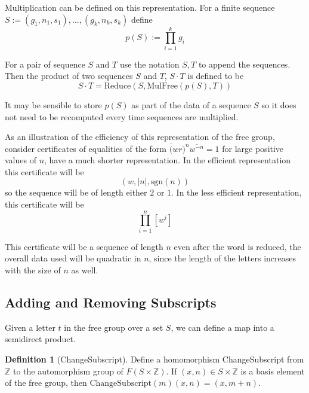 \documentclass[11pt]{article} %
\theoremstyle{definition}
\theoremstyle{definition}
\theoremstyle{definition}
\theoremstyle{definition}
\theoremstyle{definition}
\newtheorem{defn}[theorem]{Definition}
\theoremstyle{definition}
\begin{document}

Multiplication can be defined on this representation.
For a finite sequence $S := (g_1, n_1, s_1), \dots, (g_k, n_k, s_k)$
define
\begin{equation}
  p(S) := \prod_{i=1}^k g_i
\end{equation}

For a pair of sequence $S$ and $T$ use the notation $S,T$ to append the sequences.
Then the product of two sequences $S$ and $T$, $S\cdot T$ is defined to be
\begin{equation}
  S \cdot T = \text{Reduce}(S, \text{MulFree}(p(S), T))
\end{equation}

It may be sensible to store $p(S)$ as part of the data of a sequence $S$ so it does not
need to be recomputed every time sequences are multiplied.

As an illustration of the efficiency of this
representation of the free group, consider certificates of equalities
of the form $\overline(wr)^n \overline{w^{-n}} = 1$ for
large positive values of $n$,
have a much shorter representation.
In the efficient representation this certificate will
be
\begin{equation}
  (w, |n|, \text{sgn}(n))
\end{equation}
so the sequence
will be of length either $2$ or $1$. In the less efficient representation,
this certificate will be
\begin{equation}
  \prod_{i=1}^n [w^i]
\end{equation}

This certificate will be a sequence of length $n$ even after the word is reduced,
the overall data used will be quadratic in $n$, since the length of the letters
increases with the size of $n$ as well.

\subsection{Adding and Removing Subscripts}

Given a letter $t$ in the free group over a set $S$, we can define a map into a
semidirect product.

\begin{defn}[ChangeSubscript]\label{csub}
  Define a homomorphism ChangeSubscript from $\mathbb{Z}$ to the automorphism
  group of $F(S \times \mathbb{Z})$. If $(x, n) \in S \times \mathbb{Z}$ is a basis
  element of the free group, then $\text{ChangeSubscript}(m)(x, n) = (x, m + n)$.
\end{defn}
\end{document}

